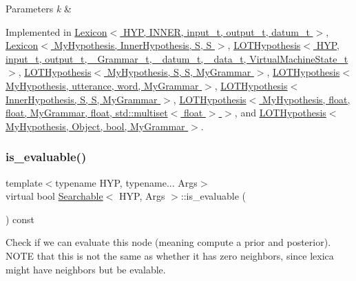 \begin{DoxyParams}{Parameters}
{\em k} & \\
\hline
\end{DoxyParams}


Implemented in \hyperlink{class_lexicon_a2b17608f66415c6a7d55b6a8f344db21}{Lexicon$<$ H\+Y\+P, I\+N\+N\+E\+R, input\+\_\+t, output\+\_\+t, datum\+\_\+t $>$}, \hyperlink{class_lexicon_a2b17608f66415c6a7d55b6a8f344db21}{Lexicon$<$ My\+Hypothesis, Inner\+Hypothesis, S, S $>$}, \hyperlink{class_l_o_t_hypothesis_ab24d0b8faa360f6a0edc4eefb17d6de7}{L\+O\+T\+Hypothesis$<$ H\+Y\+P, input\+\_\+t, output\+\_\+t, \+\_\+\+Grammar\+\_\+t, \+\_\+datum\+\_\+t, \+\_\+data\+\_\+t, Virtual\+Machine\+State\+\_\+t $>$}, \hyperlink{class_l_o_t_hypothesis_ab24d0b8faa360f6a0edc4eefb17d6de7}{L\+O\+T\+Hypothesis$<$ My\+Hypothesis, S, S, My\+Grammar $>$}, \hyperlink{class_l_o_t_hypothesis_ab24d0b8faa360f6a0edc4eefb17d6de7}{L\+O\+T\+Hypothesis$<$ My\+Hypothesis, utterance, word, My\+Grammar $>$}, \hyperlink{class_l_o_t_hypothesis_ab24d0b8faa360f6a0edc4eefb17d6de7}{L\+O\+T\+Hypothesis$<$ Inner\+Hypothesis, S, S, My\+Grammar $>$}, \hyperlink{class_l_o_t_hypothesis_ab24d0b8faa360f6a0edc4eefb17d6de7}{L\+O\+T\+Hypothesis$<$ My\+Hypothesis, float, float, My\+Grammar, float, std\+::multiset$<$ float $>$ $>$}, and \hyperlink{class_l_o_t_hypothesis_ab24d0b8faa360f6a0edc4eefb17d6de7}{L\+O\+T\+Hypothesis$<$ My\+Hypothesis, Object, bool, My\+Grammar $>$}.

\mbox{\label{class_searchable_a23786e95730117c3cc4b90e010494a1e}} 
\subsubsection{\texorpdfstring{is\+\_\+evaluable()}{is\_evaluable()}}
{\footnotesize\ttfamily template$<$typename H\+YP, typename... Args$>$ \\
virtual bool \hyperlink{class_searchable}{Searchable}$<$ H\+YP, Args $>$\+::is\+\_\+evaluable (\begin{DoxyParamCaption}{ }\end{DoxyParamCaption}) const\hspace{0.3cm}{\ttfamily [pure virtual]}}



Check if we can evaluate this node (meaning compute a prior and posterior). N\+O\+TE that this is not the same as whether it has zero neighbors, since lexica might have neighbors but be evalable. 




